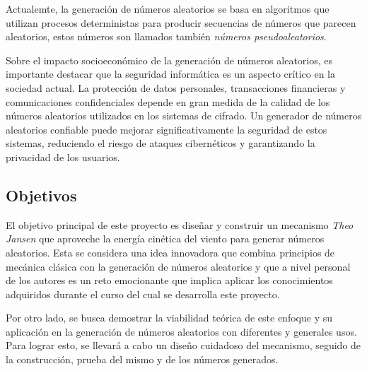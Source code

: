 Actualemte, la generación de números aleatorios se basa en algoritmos que utilizan procesos deterministas para producir secuencias de números que parecen aleatorios, estos números son llamados también \textit{números pseudoaleatorios}.

Sobre el impacto socioeconómico de la generación de números aleatorios, es importante destacar que la seguridad informática es un aspecto crítico en la sociedad actual. La protección de datos personales, transacciones financieras y comunicaciones confidenciales depende en gran medida de la calidad de los números aleatorios utilizados en los sistemas de cifrado. Un generador de números aleatorios confiable puede mejorar significativamente la seguridad de estos sistemas, reduciendo el riesgo de ataques cibernéticos y garantizando la privacidad de los usuarios.

\subsection{Objetivos}

El objetivo principal de este proyecto es diseñar y construir un mecanismo \textit{Theo Jansen} que aproveche la energía cinética del viento para generar números aleatorios. Esta se considera una idea innovadora que combina principios de mecánica clásica con la generación de números aleatorios y que a nivel personal de los autores es un reto emocionante que implica aplicar los conocimientos adquiridos durante el curso del cual se desarrolla este proyecto.

Por otro lado, se busca demostrar la viabilidad teórica de este enfoque y su aplicación en la generación de números aleatorios con diferentes y generales usos. Para lograr esto, se llevará a cabo un diseño cuidadoso del mecanismo, seguido de la construcción, prueba del mismo y de los números generados. 

